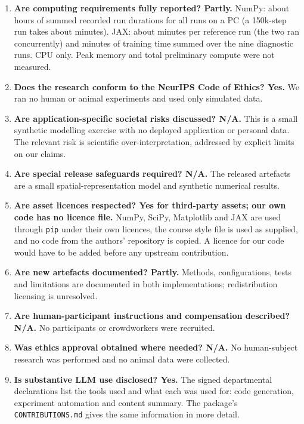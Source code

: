 \begin{enumerate}[leftmargin=1.6em,itemsep=2pt]
\item \textbf{Are computing requirements fully reported? Partly.} NumPy: about \xCpuHours{} hours of summed recorded run durations for all \nJobs{} runs on a PC (a 150k-step run takes about \trainMinLong{} minutes). JAX: about \jRefMinutes{} minutes per reference run (the two ran concurrently) and \jDiagMinutes{} minutes of training time summed over the nine diagnostic runs. CPU only. Peak memory and total preliminary compute were not measured.
\item \textbf{Does the research conform to the NeurIPS Code of Ethics? Yes.} We ran no human or animal experiments and used only simulated data.
\item \textbf{Are application-specific societal risks discussed? N/A.} This is a small synthetic modelling exercise with no deployed application or personal data. The relevant risk is scientific over-interpretation, addressed by explicit limits on our claims.
\item \textbf{Are special release safeguards required? N/A.} The released artefacts are a small spatial-representation model and synthetic numerical results.
\item \textbf{Are asset licences respected? Yes for third-party assets; our own code has no licence file.} NumPy, SciPy, Matplotlib and JAX are used through \texttt{pip} under their own licences, the course style file is used as supplied, and no code from the authors' repository is copied. A licence for our code would have to be added before any upstream contribution.
\item \textbf{Are new artefacts documented? Partly.} Methods, configurations, tests and limitations are documented in both implementations; redistribution licensing is unresolved.
\item \textbf{Are human-participant instructions and compensation described? N/A.} No participants or crowdworkers were recruited.
\item \textbf{Was ethics approval obtained where needed? N/A.} No human-subject research was performed and no animal data were collected.
\item \textbf{Is substantive LLM use disclosed? Yes.} The signed departmental declarations list the tools used and what each was used for: code generation, experiment automation and content summary. The package's \texttt{CONTRIBUTIONS.md} gives the same information in more detail.
\end{enumerate}
